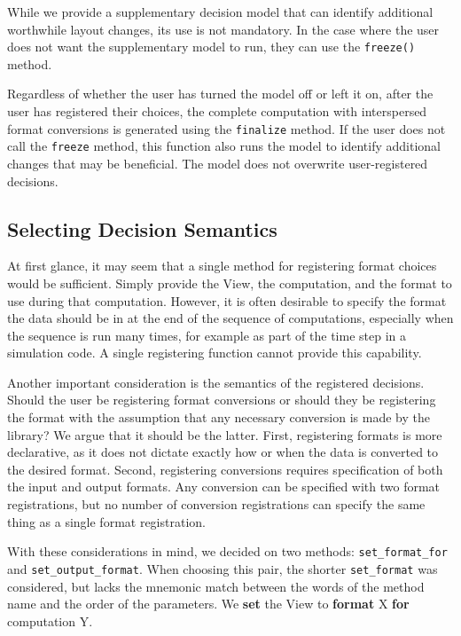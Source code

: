 \documentclass[sigconf,review=true]{acmart}
\begin{document}
While we provide a supplementary decision model that can identify additional worthwhile layout changes, its use is not mandatory.
In the case where the user does not want the supplementary model to run, they can use the \verb.freeze(). method. 

Regardless of whether the user has turned the model off or left it on, 
after the user has registered their choices, the complete computation with interspersed format conversions is generated using the \verb.finalize. method.
If the user does not call the \verb.freeze. method, this function also runs the model to identify additional changes that may be beneficial. The model does not overwrite user-registered decisions.

\subsection{Selecting Decision Semantics}

At first glance, it may seem that a single method for registering format choices would be sufficient. 
Simply provide the View, the computation, and the format to use during that computation.
However, it is often desirable to specify the format the data should be in at the end of the sequence of computations, especially when the sequence is run many times, for example as part of the time step in a simulation code.
A single registering function cannot provide this capability. 

Another important consideration is the semantics of the registered decisions. 
Should the user be registering format conversions or should they be registering the format with the assumption that any necessary conversion is made by the library?
We argue that it should be the latter.
First, registering formats is more declarative, as it does not dictate exactly how or when the data is converted to the desired format.
Second, registering conversions requires specification of both the input and output formats. 
Any conversion can be specified with two format registrations, but no number of conversion registrations can specify the same thing as a single format registration.

With these considerations in mind, we decided on two methods: \verb.set_format_for. and \verb.set_output_format..
When choosing this pair, the shorter \verb.set_format. was considered, but lacks the mnemonic match between the words of the method name and the order of the parameters. We \textbf{set} the View to \textbf{format} X \textbf{for} computation Y. 
\end{document}
